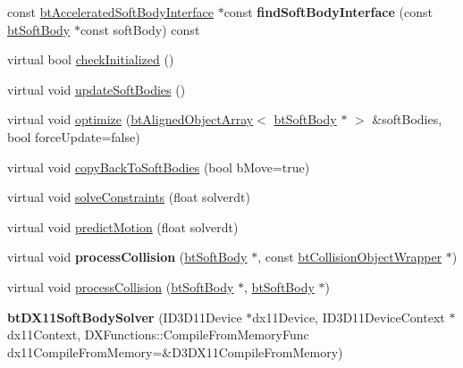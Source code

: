 \begin{DoxyCompactItemize}
\item 
\mbox{\label{classbtDX11SoftBodySolver_a6403d52a5394d082ce3e030b17fc8aa6}} 
const \hyperlink{classbtDX11SoftBodySolver_1_1btAcceleratedSoftBodyInterface}{bt\+Accelerated\+Soft\+Body\+Interface} $\ast$const {\bfseries find\+Soft\+Body\+Interface} (const \hyperlink{classbtSoftBody}{bt\+Soft\+Body} $\ast$const soft\+Body) const
\item 
virtual bool \hyperlink{classbtDX11SoftBodySolver_a22b92962365db3adc0086eaac84dde9f}{check\+Initialized} ()
\item 
virtual void \hyperlink{classbtDX11SoftBodySolver_a14550caa4b6eb1be4c47cef4a4b40336}{update\+Soft\+Bodies} ()
\item 
virtual void \hyperlink{classbtDX11SoftBodySolver_a1d181b7e59619553241ac463db54c490}{optimize} (\hyperlink{classbtAlignedObjectArray}{bt\+Aligned\+Object\+Array}$<$ \hyperlink{classbtSoftBody}{bt\+Soft\+Body} $\ast$ $>$ \&soft\+Bodies, bool force\+Update=false)
\item 
virtual void \hyperlink{classbtDX11SoftBodySolver_a0364c3791bd12386e32e9357546aeee0}{copy\+Back\+To\+Soft\+Bodies} (bool b\+Move=true)
\item 
virtual void \hyperlink{classbtDX11SoftBodySolver_ab6477819156cdc0f5850514683b77f08}{solve\+Constraints} (float solverdt)
\item 
virtual void \hyperlink{classbtDX11SoftBodySolver_a2565453dfc806f819746d7bc04a57a96}{predict\+Motion} (float solverdt)
\item 
\mbox{\label{classbtDX11SoftBodySolver_acbb4b303c74a6b2852cb5bc3038c5404}} 
virtual void {\bfseries process\+Collision} (\hyperlink{classbtSoftBody}{bt\+Soft\+Body} $\ast$, const \hyperlink{structbtCollisionObjectWrapper}{bt\+Collision\+Object\+Wrapper} $\ast$)
\item 
virtual void \hyperlink{classbtDX11SoftBodySolver_a74adb4cab44b9058b9d67b7b8116d30e}{process\+Collision} (\hyperlink{classbtSoftBody}{bt\+Soft\+Body} $\ast$, \hyperlink{classbtSoftBody}{bt\+Soft\+Body} $\ast$)
\item 
\mbox{\label{classbtDX11SoftBodySolver_a252664ab4df3d33392675e25f2499811}} 
{\bfseries bt\+D\+X11\+Soft\+Body\+Solver} (I\+D3\+D11\+Device $\ast$dx11\+Device, I\+D3\+D11\+Device\+Context $\ast$dx11\+Context, D\+X\+Functions\+::\+Compile\+From\+Memory\+Func dx11\+Compile\+From\+Memory=\&D3\+D\+X11\+Compile\+From\+Memory)

\end{DoxyCompactItemize}
